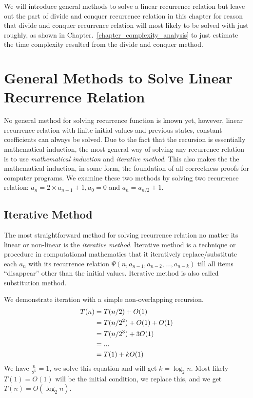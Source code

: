 \documentclass[../main.tex]{subfiles}
\begin{document}
We will introduce general methods to solve a linear recurrence relation but leave out the part of divide and conquer recurrence relation in this chapter for reason that divide and conquer recurrence relation will most likely to be solved with just roughly, as shown in Chapter.~\ref{chapter_complexity_analysis} to just estimate the time complexity resulted from the divide and conquer method. 

\section{General Methods to Solve Linear Recurrence Relation}
 No general method for solving recurrence function is known yet, however, linear recurrence relation with finite initial values and previous states, constant coefficients can always be solved. Due to the fact that the recursion is essentially mathematical induction, the most general way of solving any recurrence relation is to use \textit{mathematical induction} and \textit{iterative method}. This also makes the the mathematical induction, in some form, the foundation of all correctness proofs for computer programs.  We  examine these two methods by solving two recurrence relation: $a_n = 2\times a_{n-1} + 1, a_0 = 0$ and $a_n=a_{n/2} + 1$. 

\subsection{Iterative Method}
The most straightforward method for solving recurrence relation no matter its linear or non-linear is the \textit{iterative method}. Iterative method is a technique or procedure in computational mathematics that it iteratively replace/substitute each $a_n$ with its recurrence relation $\Psi(n, a_{n-1}, a_{n-2}, ..., a_{n-k})$ till all items ``disappear'' other than the initial values. Iterative method is also called substitution method. 

We demonstrate iteration with a simple non-overlapping recursion. 
\begin{align}
\label{complexity_eq_binary_search}
    T(n)&=T(n/2)+O(1)\\
    &=T(n/2^2)+O(1)+O(1)\notag\\
    &=T(n/2^3)+3O(1)\notag\\
    &=...\notag\\
    &=T(1)+kO(1)
\end{align}
We have $\frac{n}{2^k}=1$, we solve this equation and will get $k=\log_2 n$. Most likely $T(1)=O(1)$ will be the initial condition, we replace this, and we get $T(n)=O(\log_2 n)$.
\end{document}
